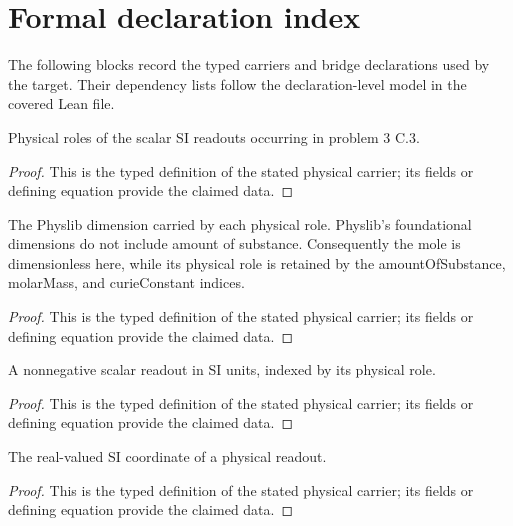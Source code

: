 \section*{Formal declaration index}
The following blocks record the typed carriers and bridge declarations used by the target.  Their dependency lists follow the declaration-level model in the covered Lean file.

\begin{definition}
  \label{def:physics:IPhO_2026_3_C_3:aux001}
  Physical roles of the scalar SI readouts occurring in problem 3 C.3.
\end{definition}
\begin{proof}
  This is the typed definition of the stated physical carrier; its fields or defining equation provide the claimed data.
\end{proof}

\begin{definition}
  \label{def:physics:IPhO_2026_3_C_3:aux002}
  The Physlib dimension carried by each physical role. Physlib's foundational dimensions do not include amount of substance. Consequently the mole is dimensionless here, while its physical role is retained by the amountOfSubstance, molarMass, and curieConstant indices.
\end{definition}
\begin{proof}
  This is the typed definition of the stated physical carrier; its fields or defining equation provide the claimed data.
\end{proof}

\begin{definition}
  \label{def:physics:IPhO_2026_3_C_3:aux003}
  A nonnegative scalar readout in SI units, indexed by its physical role.
\end{definition}
\begin{proof}
  This is the typed definition of the stated physical carrier; its fields or defining equation provide the claimed data.
\end{proof}

\begin{definition}
  \label{def:physics:IPhO_2026_3_C_3:aux004}
  The real-valued SI coordinate of a physical readout.
\end{definition}
\begin{proof}
  This is the typed definition of the stated physical carrier; its fields or defining equation provide the claimed data.
\end{proof}

